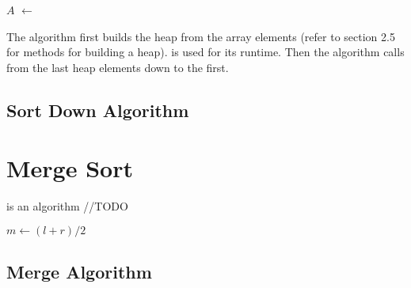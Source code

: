 \documentclass{report}
\begin{document}
\begin{algorithm}
    \begin{algorithmic}[0]
       
        \State $A$ $\gets$ 
          \State {}
        \EndFor
        \State {}
      \EndFunction
    \end{algorithmic}
\end{algorithm}

The algorithm first builds the heap from the array elements (refer to section 2.5 for methods for building a heap).  is used for its runtime. Then the algorithm calls  from the last heap elements down to the first.

\subsection{Sort Down Algorithm}



\section{Merge Sort}

 is an algorithm //TODO

\begin{algorithm}
    \begin{algorithmic}[0]
       
          \State $m \gets (l + r) / 2$
          \State {}
          \State {}
          \State {}
        \EndIf
        \State {}
      \EndFunction
    \end{algorithmic}
\end{algorithm}

\subsection{Merge Algorithm}
\end{document}
